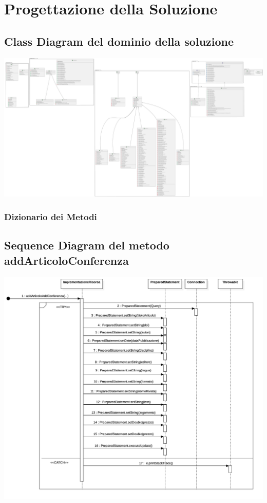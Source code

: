 \chapter{Progettazione della Soluzione}

\section{Class Diagram del dominio della soluzione}
\includegraphics[scale=0.05]{Immagini/PDiagram.png}
\subsection{Dizionario dei Metodi}
\section{Sequence Diagram del metodo addArticoloConferenza}
\includegraphics[scale=0.15]{Immagini/AddArtConf_SD.png}
